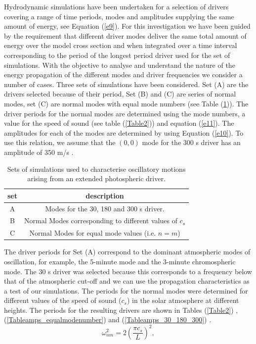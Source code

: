 \documentclass[preprint,authoryear,12pt]{elsarticle}
\begin{document}
Hydrodynamic simulations have been undertaken for a selection of drivers covering a range of time periods, modes and amplitudes supplying the same amount of energy, see Equation (\ref{e9}). For this investigation we have been guided by the requirement that  different driver modes deliver the same total amount of energy 
over the model cross section and when integrated over a time interval corresponding to the period of the longest period driver used for the set of simulations. With the objective to analyse and understand the nature of the energy propagation of the different modes and driver frequencies we consider a number of cases.   Three sets of simulations have been considered. Set (A) are the drivers selected because of their period, Set (B) and (C) are series of normal modes, set (C) are normal modes with equal mode numbers (see Table (\ref{Table1})). The driver periods for the normal modes are determined using the mode numbers, a value for the speed of sound (see table (\ref{Table2})) and equation (\ref{e11}). The amplitudes for each of the modes are determined by using  Equation (\ref{e10}). To use this relation, we assume 
that the $(0, 0)$ mode for the 300 s driver has an amplitude of 350 m/s \citep[see][]{Leighton1960}.
\begin{table}
\centering
\begin{tabular}{c c }
\hline
set   &  description\\
\hline
A &  Modes for the 30, 180 and 300 s driver. \\
\hline
B &  Normal Modes corresponding to different values of $c_s$ \\
\hline
C & Normal Modes for equal mode values (i.e. $n=m$)  \\
\hline
\end{tabular} 
\caption{Sets of simulations used to characterise oscillatory motions arising from an extended photospheric driver.}
\label{Table1}
\end{table}
The driver periods for Set (A) correspond to the dominant atmospheric modes of oscillation, for example, the 5-minute mode and the 3-minute chromospheric mode. The 30 s driver was selected because this corresponds to a frequency below that of the atmospheric cut-off and we can use the propagation characteristics as a test of our simulations. The periods for the normal modes were determined for different values of the speed of sound ($c_s$) in the solar atmosphere at different heights. The periods for the resulting drivers are shown in Tables (\ref{Table2})  ,   (\ref{Tableamps_equalmodenumber}) and (\ref{Tableamps_30_180_300}) .
\begin{equation}
\omega_{nm}^{2}= 2\left(\frac{\pi c_{s}}{L} \right)^{2},
\label{e11}
\end{equation}
\end{document}
